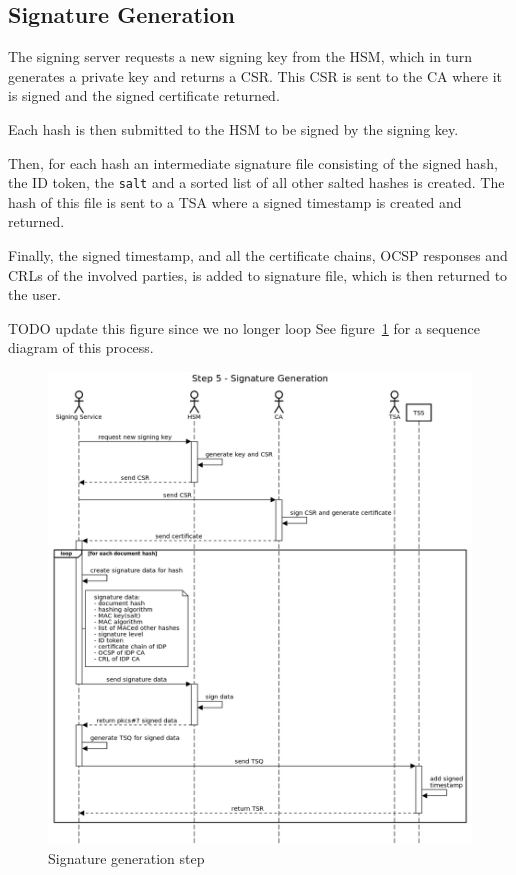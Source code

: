 \subsection{Signature Generation}\label{subsec:signature-generation}
The signing server requests a new signing key from the \gls{HSM}, which in turn generates a private key and returns a \gls{CSR}.
This \gls{CSR} is sent to the \gls{CA} where it is signed and the signed certificate returned.

Each hash is then submitted to the \gls{HSM} to be signed by the signing key.

Then, for each hash an intermediate signature file consisting of the signed hash,
the ID token, the \texttt{salt} and a sorted list of all other salted hashes is created.
The hash of this file is sent to a \gls{TSA} where a signed timestamp is created and returned.

Finally, the signed timestamp, and all the certificate chains,
\gls{OCSP} responses and \gls{CRL}s of the involved parties,
is added to signature file, which is then returned to the user.

TODO update this figure since we no longer loop
See figure~\ref{fig:signaturegenerationstep} for a sequence diagram of this process.

\begin{figure}
	\begin{center}
		\includegraphics[scale=0.45]{images/protocol_step5_signature_generation.png}
		\caption{Signature generation step}
		\label{fig:signaturegenerationstep}
	\end{center}
\end{figure}

